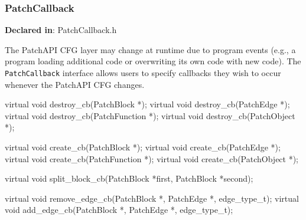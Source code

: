 \subsubsection{PatchCallback}
\label{sec-3.2.7}

\textbf{Declared in}: PatchCallback.h

The PatchAPI CFG layer may change at runtime due to program events
(e.g., a program loading additional code or overwriting its own code
with new code). The \texttt{PatchCallback} interface allows users to
specify callbacks they wish to occur whenever the PatchAPI CFG
changes.

\begin{apient}
virtual void destroy_cb(PatchBlock *);
virtual void destroy_cb(PatchEdge *);
virtual void destroy_cb(PatchFunction *);
virtual void destroy_cb(PatchObject *);
\end{apient}



\begin{apient}
virtual void create_cb(PatchBlock *);
virtual void create_cb(PatchEdge *);
virtual void create_cb(PatchFunction *);
virtual void create_cb(PatchObject *);
\end{apient}



\begin{apient}
virtual void split_block_cb(PatchBlock *first, PatchBlock *second);
\end{apient}



\begin{apient}
virtual void remove_edge_cb(PatchBlock *, PatchEdge *, edge_type_t);
virtual void add_edge_cb(PatchBlock *, PatchEdge *, edge_type_t);

\end{apient}


